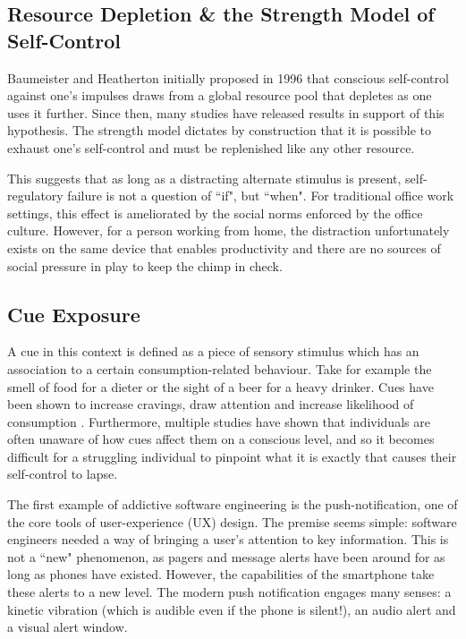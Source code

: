 \subsection{Resource Depletion \& the Strength Model of Self-Control}
Baumeister and Heatherton \cite{baumeister1996self} initially proposed in 1996 that conscious self-control against one's impulses draws from a global resource pool that depletes as one uses it further. Since then, many studies have released results in support of this hypothesis. The strength model dictates by construction that it is possible to exhaust one's self-control and must be replenished like any other resource.

This suggests that as long as a distracting alternate stimulus is present, self-regulatory failure is not a question of ``if", but ``when". For traditional office work settings, this effect is ameliorated by the social norms enforced by the office culture. However, for a person working from home, the distraction unfortunately exists on the same device that enables productivity and there are no sources of social pressure in play to keep the chimp in check.

\subsection{Cue Exposure}
A cue in this context is defined as a piece of sensory stimulus which has an association to a certain consumption-related behaviour. Take for example the smell of food for a dieter or the sight of a beer for a heavy drinker. Cues have been shown to increase cravings, draw attention and increase likelihood of consumption \cite{jansen1998learning}. Furthermore, multiple studies \cite{stacy2010implicit} have shown that individuals are often unaware of how cues affect them on a conscious level, and so it becomes difficult for a struggling individual to pinpoint what it is exactly that causes their self-control to lapse.

The first example of addictive software engineering is the push-notification, one of the core tools of user-experience (UX) design. The premise seems simple: software engineers needed a way of bringing a user's attention to key information. This is not a ``new" phenomenon, as pagers and message alerts have been around for as long as phones have existed. However, the capabilities of the smartphone take these alerts to a new level. The modern push notification engages many senses: a kinetic vibration (which is audible even if the phone is silent!), an audio alert and a visual alert window.

